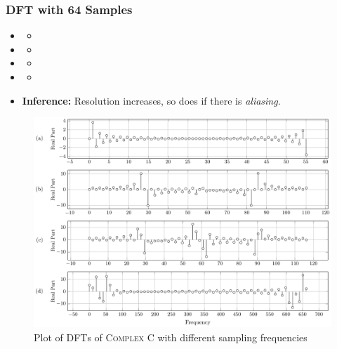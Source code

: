 \documentclass[../../course]{subfiles}
\begin{document}
\subsubsection{DFT with 64 Samples}

\begin{itemize} [label=]

    \item \sampFreqMuchLess
        \begin{itemize} [label=]
            \item
        \end{itemize}

    \item \sampFreqNorm
        \begin{itemize} [label=]
            \item
        \end{itemize}

    \item \sampFreqSligGreat
        \begin{itemize} [label=]
            \item
        \end{itemize}

    \item \sampFreqMuchGreat
        \begin{itemize} [label=]
            \item
        \end{itemize}

    \item \textbf{Inference:} Resolution increases, so does if there is \emph{aliasing}.

\end{itemize}

\vfill

\begin{figure} [H]
    \centering
     {
        \includegraphics[height = 0.8\textheight] {tikzpics/plotDftComplexC64.pdf}
    }
     {Plot of \textsc{DFT}s of \textsc{Complex C} with different sampling frequencies}
    \label{plt:dftComplexC}
\end{figure}
\end{document}
